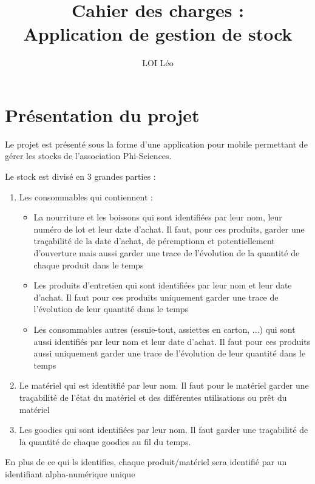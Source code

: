 \documentclass{article}
\title{Cahier des charges :\\Application de gestion de stock}
\author{LOI Léo}
\begin{document}
\maketitle
\tableofcontents
\newpage

\section{Présentation du projet}
  Le projet est présenté sous la forme d’une application pour mobile permettant de gérer les stocks de l’association Phi-Sciences.

  Le stock est divisé en 3 grandes parties : 
  \begin{enumerate}
    \item Les consommables qui contiennent : 
    \begin{itemize}
      \item La nourriture et les boissons qui sont identifiées par leur nom, leur numéro de lot et leur date d'achat. Il faut, pour ces produits, garder une traçabilité de la date d'achat, de péremptionn et potentiellement d'ouverture mais aussi garder une trace de l'évolution de la quantité de chaque produit dans le temps
      \item Les produits d’entretien qui sont identifiées par leur nom et leur date d'achat. Il faut pour ces produits uniquement garder une trace de l'évolution de leur quantité dans le temps
      \item Les consommables autres (essuie-tout, assiettes en carton, ...) qui sont aussi identifiés par leur nom et leur date d'achat. Il faut pour ces produits aussi uniquement garder une trace de l'évolution de leur quantité dans le temps
    \end{itemize}
    \item Le matériel qui est identitfié par leur nom. Il faut pour le matériel garder une traçabilité de l'état du matériel et des différentes utilisations ou prêt du matériel
    \item Les goodies qui sont identifiées par leur nom. Il faut garder une traçabilité de la quantité de chaque goodies au fil du temps.
  \end{enumerate}
  En plus de ce qui ls identifies, chaque produit/matériel sera identifié par un identifiant alpha-numérique unique
\end{document}
